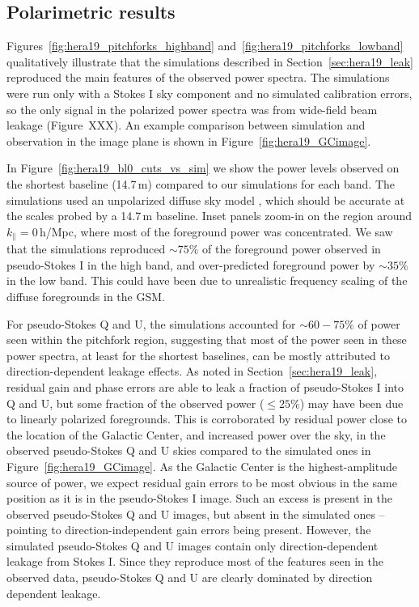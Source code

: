 \subsection{Polarimetric results}
\label{subsec:polarimetric_results}

Figures~\ref{fig:hera19_pitchforks_highband} and~\ref{fig:hera19_pitchforks_lowband} qualitatively illustrate that the simulations described in Section~\ref{sec:hera19_leak} reproduced the main features of the observed power spectra. The simulations were run only with a Stokes I sky component and no simulated calibration errors, so the only signal in the polarized power spectra was from wide-field beam leakage (Figure~XXX). An example comparison between simulation and observation in the image plane is shown in Figure~\ref{fig:hera19_GCimage}.

In Figure~\ref{fig:hera19_bl0_cuts_vs_sim} we show the power levels observed on the shortest baseline (14.7\,m) compared to our simulations for each band. The simulations used an unpolarized diffuse sky model \citep[the most recent version of the GSM;][]{GSM.17}, which should be accurate at the scales probed by a 14.7\,m baseline. Inset panels zoom-in on the region around $k_{\parallel}=0$\,h/Mpc, where most of the foreground power was concentrated.
We saw that the simulations reproduced $\sim75\%$ of the foreground power observed in pseudo-Stokes I in the high band, and over-predicted foreground power by $\sim35\%$ in the low band. This could have been due to unrealistic frequency scaling of the diffuse foregrounds in the GSM. 

For pseudo-Stokes Q and U, the simulations accounted for $\sim 60-75\%$ of power seen within the pitchfork region, suggesting that most of the power seen in these power spectra, at least for the shortest baselines, can be mostly attributed to direction-dependent leakage effects. As noted in Section~\ref{sec:hera19_leak}, residual gain and phase errors are able to leak a fraction of pseudo-Stokes I into Q and U, but some fraction of the observed power ($\leqslant 25\%$) may have been due to linearly polarized foregrounds. This is corroborated by residual power close to the location of the Galactic Center, and increased power over the sky, in the observed pseudo-Stokes Q and U skies compared to the simulated ones in Figure~\ref{fig:hera19_GCimage}. As the Galactic Center is the highest-amplitude source of power, we expect residual gain errors to be most obvious in the same position as it is in the pseudo-Stokes I image. Such an excess is present in the observed pseudo-Stokes Q and U images, but absent in the simulated ones -- pointing to direction-independent gain errors being present. However, the simulated pseudo-Stokes Q and U images contain only direction-dependent leakage from Stokes I. Since they reproduce most of the features seen in the observed data, pseudo-Stokes Q and U are clearly dominated by direction dependent leakage.

